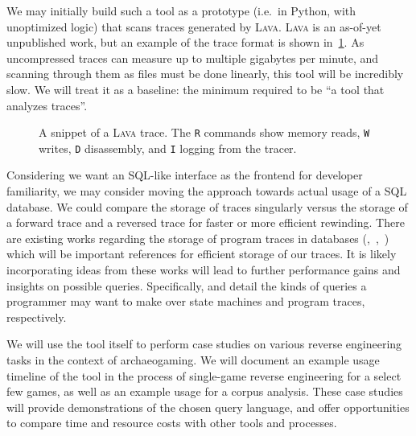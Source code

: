 \documentclass[manuscript,anonymous,review,authorversion=true,nonacm=true,screen]{acmart}
\begin{document}
We may initially build such a tool as a prototype (i.e.\ in Python, with unoptimized logic) that scans traces generated by \textsc{Lava}.
\textsc{Lava} is an as-of-yet unpublished work, but an example of the trace format is shown in~\cref{fig:lava-snippet}.
As uncompressed traces can measure up to multiple gigabytes per minute, and scanning through them as files must be done linearly, this tool will be incredibly slow.
We will treat it as a baseline: the minimum required to be ``a tool that analyzes traces''.

\begin{figure}[ht]
    \centering\resizebox{0.4\textwidth}{!}{\theverbbox}
    \caption{A snippet of a \textsc{Lava} trace. The \texttt{R} commands show memory reads, \texttt{W} writes, \texttt{D} disassembly, and \texttt{I} logging from the tracer.}
    \label{fig:lava-snippet}
\end{figure}

Considering we want an SQL-like interface as the frontend for developer familiarity, we may consider moving the approach towards actual usage of a SQL database.
We could compare the storage of traces singularly versus the storage of a forward trace and a reversed trace for faster or more efficient rewinding.
There are existing works regarding the storage of program traces in databases (\cite{andjelkovic2011trace},~\cite{montplaisir2013efficient},~\cite{dolan2015repeatable}) which will be important references for efficient storage of our traces.
It is likely incorporating ideas from these works will lead to further performance gains and insights on possible queries.
Specifically, \cite{osborn2015playspecs} and \cite{goldsmith2005relational} detail the kinds of queries a programmer may want to make over state machines and program traces, respectively.

We will use the tool itself to perform case studies on various reverse engineering tasks in the context of archaeogaming.
We will document an example usage timeline of the tool in the process of single-game reverse engineering for a select few games, as well as an example usage for a corpus analysis.
These case studies will provide demonstrations of the chosen query language, and offer opportunities to compare time and resource costs with other tools and processes.
\end{document}
